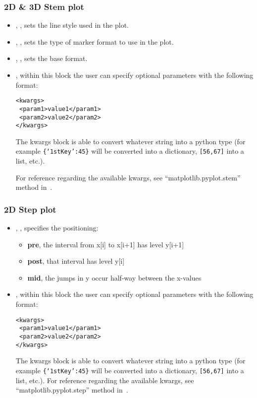 \subsubsection{2D \& 3D Stem plot}
  \begin{itemize}
  \item {}, , sets the line
  style used in the plot.
  \item {}, , sets the type of
  marker format to use in the plot.
  \item {}, , sets the base
  format.
  \item {}, within this block the user can specify optional
  parameters with the following format:

\begin{lstlisting}[style=XML]
<kwargs>
 <param1>value1</param1>
 <param2>value2</param2>
</kwargs>
\end{lstlisting}
  The kwargs block is able to convert whatever string into a python type (for
  example  \texttt{\{`1stKey':45\}} will
  be converted into a dictionary,
   \texttt{[56,67]}  into a list, etc.).

  For reference regarding the available kwargs, see ``matplotlib.pyplot.stem''
  method in~\cite{MatPlotLib}.
    \end{itemize}

\subsubsection{2D Step plot}
  \begin{itemize}
    \item {}, , specifies the
    positioning:
    \begin{itemize}
      \item \textbf{pre}, the interval from x[i] to x[i+1] has level y[i+1]
      \item \textbf{post}, that interval has level y[i]
      \item \textbf{mid}, the jumps in y occur half-way between the x-values
    \end{itemize}
  \item {}, within this block the user can specify optional
  parameters with the following format:

\begin{lstlisting}[style=XML]
<kwargs>
 <param1>value1</param1>
 <param2>value2</param2>
</kwargs>
\end{lstlisting}
  The kwargs block is able to convert whatever string into a python type (for
  example  \texttt{\{`1stKey':45\}} will
  be converted into a dictionary,
   \texttt{[56,67]}  into a list, etc.).
    For reference regarding the available kwargs, see ``matplotlib.pyplot.step''
    method in~\cite{MatPlotLib}.
  \end{itemize}

